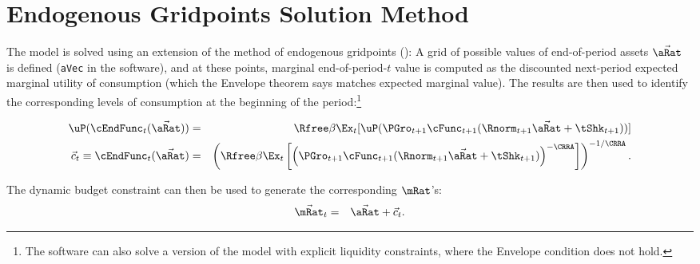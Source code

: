 \documentclass[./BufferStockTheory.tex]{subfiles}
\begin{document}
\section{Endogenous Gridpoints Solution Method}

  The model is solved using an extension of the method of endogenous
  gridpoints (\cite{BufferStockTheory}): A grid of possible values of
  end-of-period assets $\vec{\aRat}$ is defined (\texttt{aVec} in the
  software), and at these points, marginal end-of-period-$t$ value is
  computed as the discounted next-period expected marginal utility of
  consumption (which the Envelope theorem says matches expected
  marginal value).  The results are then used to identify the
  corresponding levels of consumption at the beginning of the period:\footnote{The software can also
solve a version of the model with explicit liquidity constraints, where the Envelope condition does not hold.}

\begin{eqnarray}
  \uP(\cEndFunc_{t}(\vec{\aRat})) & = & \Rfree \beta \Ex_{t}[ \uP(\PGro_{t+1}
  \cFunc_{t+1}(\Rnorm_{t+1}\vec{\aRat} + \tShk_{t+1}))] \label{eq:cEulerEndog}
\\ \vec{c}_{t} \equiv \cEndFunc_{t}(\vec{\aRat}) & = & \left(\Rfree \beta \Ex_{t}\left[ \left(\PGro_{t+1}
      \cFunc_{t+1}(\Rnorm_{t+1}\vec{\aRat} +
      \tShk_{t+1})\right)^{-\CRRA}\right]\right)^{-1/\CRRA}. \notag
\end{eqnarray}

The dynamic budget constraint can then be used to generate the corresponding $\mRat$'s:
\begin{eqnarray*}
  \vec{\mRat}_{t} & = & \vec{\aRat}+\vec{c}_{t}.
\end{eqnarray*}
\end{document}
